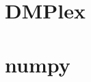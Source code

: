\documentclass[thesis]{subfiles}
\begin{document}

\section{DMPlex}




%
%
%
%
%


\section{numpy}

\end{document}
